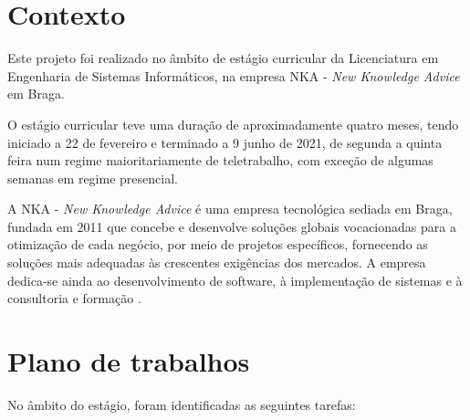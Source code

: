 
\section{Contexto}
\par Este projeto foi realizado no âmbito de estágio curricular da Licenciatura em Engenharia de Sistemas Informáticos, na empresa NKA - \textit{New Knowledge Advice} em Braga.
\par O estágio curricular teve uma duração de aproximadamente quatro meses, tendo iniciado a 22 de fevereiro e terminado a 9 junho de 2021, de segunda a quinta feira num regime maioritariamente de teletrabalho, com exceção de algumas semanas em regime presencial.
\par A NKA - \textit{New Knowledge Advice} é uma empresa tecnológica sediada em Braga, fundada em 2011 que concebe e desenvolve soluções globais vocacionadas para a otimização de cada negócio, por meio de projetos específicos, fornecendo as soluções mais adequadas às crescentes exigências dos mercados. A empresa dedica-se ainda ao desenvolvimento de software, à implementação de sistemas e à consultoria e formação \citep{nka}.

\section{Plano de trabalhos}

No âmbito do estágio, foram identificadas as seguintes tarefas:

